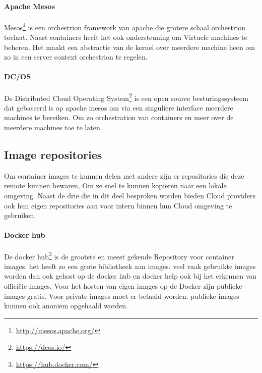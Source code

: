 \paragraph{Apache Mesos}
Mesos\footnote{\url{http://mesos.apache.org/}} is een orchestrion framework van apache die grotere schaal orchestrion toelaat. Naast containers heeft het ook ondersteuning om Virtuele machines te beheren. Het maakt een abstractie van de kernel over meerdere machine heen om zo in een server context orchestrion te regelen.
\paragraph{DC/OS}
De Distributed Cloud Operating System\footnote{\url{https://dcos.io/}} is een open source besturingssysteem dat gebaseerd is op apache mesos om via een singuliere interface meerdere machines te bereiken. Om zo orchestration van containers en meer over de meerdere machines toe te laten.
\subsection{Image repositories}
Om container images te kunnen delen met andere zijn er repositories die deze remote kunnen bewaren, Om ze snel te kunnen kopiëren naar een lokale omgeving. Naast de drie die in dit deel besproken worden bieden Cloud providers ook hun eigen repositories aan voor intern binnen hun Cloud omgeving te gebruiken.
\paragraph{Docker hub}
De docker hub\footnote{\url{https://hub.docker.com/}} is de grootste en meest gekende Repository voor container images. het heeft zo een grote bibliotheek aan images. veel vaak gebruikte images worden dan ook gehost op de docker hub en docker help ook bij het erkennen van officiële images. Voor het hosten van eigen images op de Docker zijn publieke images gratis. Voor private images moet er betaald worden. publieke images kunnen ook anoniem opgehaald worden.

